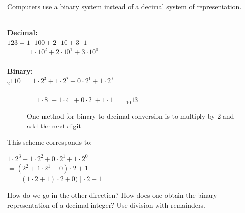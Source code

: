 \documentclass[a4paper,12pt,]{report}
\begin{document}
	Computers use a binary system instead of a decimal system of representation.\\ \\

\begin{tabbing}
	\hspace*{2cm}\={\textbf{Decimal:}}\hspace*{2cm}\= \hspace*{2cm}\= \hspace*{2cm}\\
	\>$123=1\cdot100+2\cdot10+3\cdot1$\\
	\>$\qquad \! =1\cdot10^2+2\cdot10^1 \! \!+3\cdot10^0$\\ \\
	\>\textbf{Binary:}\\
	\>$_2 1101 = 1\cdot2^3 + 1\cdot2^2+0\cdot2^1+1\cdot2^0$\\ \\
	\>$\qquad \quad \! =1\cdot8 \; +1\cdot4\;\,+0\cdot2 \; +1\cdot1\;=\;_{10}\!13$ \\
\end{tabbing}

\begin{figure}[!htb]
	\caption{One method for binary to decimal conversion is to multiply by 2 and add the next digit.}
	\label{fig:Binary to Decimal Conversion}
\end{figure}

	This scheme corresponds to:

\begin{tabbing}
	\hspace*{2cm}\=$1\cdot2^3+1\cdot2^2+0\cdot2^1+1\cdot2^0$\\
	\>\qquad$=(2^2+1\cdot2^1+0)\cdot2+1$\\
	\>\qquad$=[(1\cdot2+1)\cdot2+0)]\cdot2+1$\\
\end{tabbing}


	How do we go in the other direction?  How does one obtain the binary representation of a decimal 
	integer? Use division with remainders.\\
\end{document}
